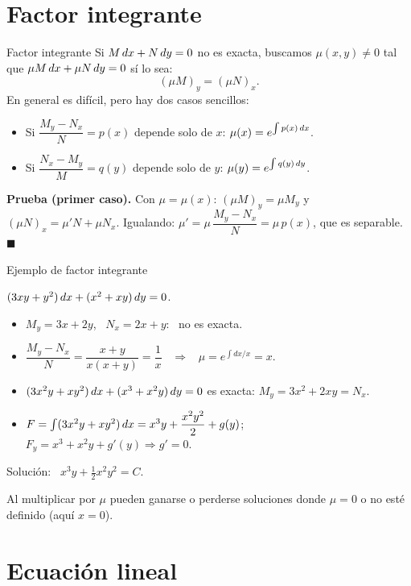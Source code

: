 \documentclass[10pt,aspectratio=169]{beamer}
\begin{document}
\section{Factor integrante}

\begin{frame}{Factor integrante}
  Si $M\,dx+N\,dy=0$ no es exacta, buscamos $\mu(x,y)\neq0$ tal que $\mu M\,dx+\mu N\,dy=0$ sí lo sea:
  \[ (\mu M)_y=(\mu N)_x. \]
  En general es difícil, pero hay dos casos sencillos:
  \begin{teorema}
    \begin{itemize}
      \item Si $\dfrac{M_y-N_x}{N}=p(x)$ depende solo de $x$: \quad $\mu(x)=e^{\int p(x)\,dx}$.
      \item Si $\dfrac{N_x-M_y}{M}=q(y)$ depende solo de $y$: \quad $\mu(y)=e^{\int q(y)\,dy}$.
    \end{itemize}
  \end{teorema}
  \textbf{Prueba (primer caso).} Con $\mu=\mu(x)$: $(\mu M)_y=\mu M_y$ y $(\mu N)_x=\mu'N+\mu N_x$. Igualando:
  $\mu'=\mu\,\dfrac{M_y-N_x}{N}=\mu\,p(x)$, que es separable. $\blacksquare$
\end{frame}

\begin{frame}{Ejemplo de factor integrante}
  \begin{ejemplo}[1]
    $(3xy+y^2)\,dx+(x^2+xy)\,dy=0$.
    \begin{itemize}
      \item $M_y=3x+2y$, \ $N_x=2x+y$: \ no es exacta.
      \item $\dfrac{M_y-N_x}{N}=\dfrac{x+y}{x(x+y)}=\dfrac1x$ \ $\Rightarrow$ \ $\mu=e^{\int dx/x}=x$.
      \item $(3x^2y+xy^2)\,dx+(x^3+x^2y)\,dy=0$ es exacta: $M_y=3x^2+2xy=N_x$. \checkmark
      \item $F=\int(3x^2y+xy^2)\,dx=x^3y+\dfrac{x^2y^2}{2}+g(y)$; \ $F_y=x^3+x^2y+g'(y)\Rightarrow g'=0$.
    \end{itemize}
    Solución: \ $\boxed{x^3y+\tfrac12x^2y^2=C}$.
  \end{ejemplo}
  \begin{observacion}
    Al multiplicar por $\mu$ pueden ganarse o perderse soluciones donde $\mu=0$ o no esté definido (aquí $x=0$).
  \end{observacion}
\end{frame}

\section{Ecuación lineal}
\end{document}
